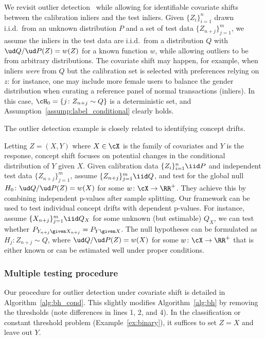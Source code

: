 \begin{example}\normalfont
We revisit outlier detection~\cite{bates2021testing}
while allowing for identifiable covariate shifts between the calibration inliers
and the test inliers.
Given $\{Z_i\}_{i=1}^n$ drawn i.i.d.~from
an unknown distribution $P$
and a set of test data $\{Z_{n+j}\}_{j=1}^m$,
we assume the inliers in
the test data are i.i.d.~from a distribution $Q$
with $\ud Q/\ud P(Z)=w(Z)$ for a known function $w$, while allowing
outliers to be from arbitrary distributions.
The covariate shift may happen, for example, when
inliers \emph{were} from $Q$ but
the calibration set is selected with preferences
relying on $z$: for instance,
one may include more female users to balance the gender distribution
when curating
a reference panel of normal transactions (inliers).
In this case, $\cH_0 = \{j\colon Z_{n+j}\sim Q\}$
is a deterministic set, and Assumption~\ref{assump:label_conditional} clearly holds.
\end{example}

The outlier detection example is closely related to
identifying concept drifts.

\begin{example}\normalfont
Letting $Z=(X,Y)$ where $X\in \cX$ is the family of covariates and
$Y$ is the response, concept shift
focuses on potential changes in the conditional distribution of $Y$ given $X$.
Given calibration data $\{Z_i\}_{i=1}^n\iid P$
and independent test data $\{Z_{n+j}\}_{j=1}^m$,
\cite{hu2020distribution}
assume $\{Z_{n+j}\}_{j=1}^m \iid Q$,
and test for the global null $H_0\colon \ud Q/\ud P(Z) = w(X)$
for some $w\colon \cX\to \RR^+$. They achieve this by combining independent p-values
after sample splitting.
Our framework can be used to test
individual concept drifts with dependent p-values. For instance,
assume $\{X_{n+j}\}_{j=1}^m\iid Q_X$ for some unknown (but estimable) $Q_X$,
we can test whether
$P_{Y_{n+j}\given X_{n+j}} = P_{Y\given X}$.
The null hypotheses can be formulated as
$H_j\colon Z_{n+j}\sim Q$, where $\ud Q/\ud P(Z)=w(X)$
for some  $w\colon \cX\to \RR^+$ that is either known
or can be estimated well under proper conditions.
\end{example}

\subsubsection{Multiple testing procedure}

Our procedure for outlier detection under covariate shift is detailed
in Algorithm~\ref{alg:bh_cond}. This
slightly modifies Algorithm~\ref{alg:bh}
by removing the thresholds (note differences in lines 1, 2, and 4).
In the classification or constant threshold problem
(Example~\ref{ex:binary}), it suffices to set $Z=X$ and leave out $Y$.

